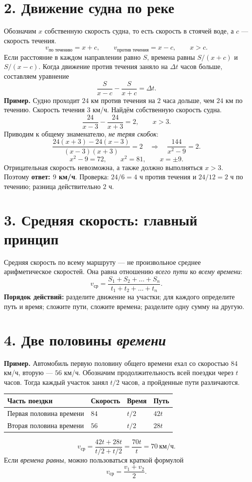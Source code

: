 \documentclass[a4paper,12pt]{article}
\newcommand{\sectiontitle}[1]{\section*{\color{darkaccent}#1}\vspace{-2mm}}
\newcommand{\key}[1]{\textcolor{darkaccent}{\textbf{#1}}}
\newcommand{\exlabel}[1]{\textbf{\color{darkaccent}Пример.} #1}
\newcommand{\vavg}{v_{\text{ср}}}
\begin{document}
\sectiontitle{2. Движение судна по реке}
Обозначим $x$ собственную скорость судна, то есть скорость в стоячей воде, а $c$ --- скорость течения.
\[
\boxed{v_{\text{по течению}}=x+c,\qquad
v_{\text{против течения}}=x-c,\qquad x>c.}
\]
Если расстояние в каждом направлении равно $S$, времена равны $S/(x+c)$ и $S/(x-c)$. Когда движение против течения заняло на $\Delta t$ часов больше, составляем уравнение
\[
\boxed{\frac{S}{x-c}-\frac{S}{x+c}=\Delta t.}
\]
\exlabel{Судно проходит $24$ км против течения на $2$ часа дольше, чем $24$ км по течению. Скорость течения $3$ км/ч. Найдём собственную скорость судна.}
\[
\frac{24}{x-3}-\frac{24}{x+3}=2,\qquad x>3.
\]
Приводим к общему знаменателю, \emph{не теряя скобок}:
\[
\frac{24(x+3)-24(x-3)}{(x-3)(x+3)}=2
\quad\Longrightarrow\quad
\frac{144}{x^2-9}=2.
\]
\[
x^2-9=72,\qquad x^2=81,\qquad x=\pm9.
\]
Отрицательная скорость невозможна, а также должно выполняться $x>3$. Поэтому \key{ответ: $9$ км/ч}. Проверка: $24/6=4$ ч против течения и $24/12=2$ ч по течению; разница действительно $2$ ч.

\clearpage
\sectiontitle{3. Средняя скорость: главный принцип}
Средняя скорость по всему маршруту --- не произвольное среднее арифметическое скоростей. Она равна отношению \emph{всего пути} ко \emph{всему времени}:
\[
\boxed{\vavg=\frac{S_1+S_2+\dots+S_n}{t_1+t_2+\dots+t_n}.}
\]
\key{Порядок действий:} разделите движение на участки; для каждого определите путь и время; сложите пути, сложите времена; разделите одну сумму на другую.

\sectiontitle{4. Две половины \emph{времени}}
\exlabel{Автомобиль первую половину общего времени ехал со скоростью $84$ км/ч, вторую --- $56$ км/ч.}
Обозначим продолжительность всей поездки через $t$ часов. Тогда каждый участок занял $t/2$ часов, а пройденные пути различаются.
\begin{center}
\begin{tabular}{@{}p{42mm}p{36mm}p{40mm}p{33mm}@{}}
\toprule
Часть поездки & Скорость & Время & Путь \\
\midrule
Первая половина времени & $84$ & $t/2$ & $42t$ \\
Вторая половина времени & $56$ & $t/2$ & $28t$ \\
\bottomrule
\end{tabular}
\end{center}
\[
\vavg=\frac{42t+28t}{t/2+t/2}=\frac{70t}{t}=
\boxed{70\ \text{км/ч}}.
\]
Если \emph{времена равны}, можно пользоваться краткой формулой
\[
\boxed{\vavg=\frac{v_1+v_2}{2}.}
\]
\end{document}
